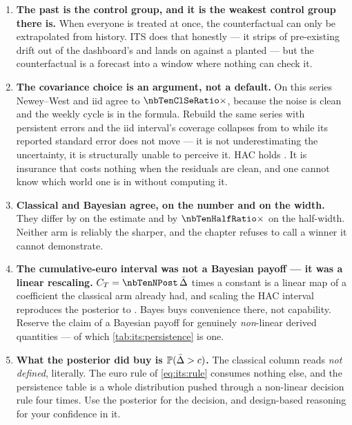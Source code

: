 \begin{enumerate}[leftmargin=*, itemsep=.45em]
  \item \textbf{The past is the control group, and it is the weakest control group there is.} When
        everyone is treated at once, the counterfactual can only be extrapolated from history. ITS
        does that honestly --- it strips \pp{\nbTenClDriftRemoved} of pre-existing drift out of the
        dashboard's \pp{\nbTenNaive} and lands on \pp{\nbTenClAvg} against a planted
        \pp{+\nbTenTrueLift} --- but the counterfactual is a forecast into a window where nothing
        can check it.

  \item \textbf{The covariance choice is an argument, not a default.} On this series Newey--West
        and iid agree to $\nbTenClSeRatio\times$, because the noise is clean and the weekly cycle is
        in the formula. Rebuild the same series with persistent errors and the iid interval's
        coverage collapses from \pc{\nbTenArCovIidZero} to \pc{\nbTenArCovIidEight} while its
        reported standard error does not move --- it is not underestimating the uncertainty, it is
        structurally unable to perceive it. HAC holds \pc{\nbTenArCovHacEight}. It is insurance that
        costs nothing when the residuals are clean, and one cannot know which world one is in
        without computing it.

  \item \textbf{Classical and Bayesian agree, on the number and on the width.} They differ by
        \pp{\nbTenEstDiff} on the estimate and by $\nbTenHalfRatio\times$ on the half-width. Neither
        arm is reliably the sharper, and the chapter refuses to call a winner it cannot demonstrate.

  \item \textbf{The cumulative-euro interval was not a Bayesian payoff --- it was a linear
        rescaling.} $C_T = \nbTenNPost\,\bar\Delta$ times a constant is a linear map of a
        coefficient the classical arm already had, and scaling the HAC interval reproduces the
        posterior to \eur{\nbTenEurGap}. Bayes buys convenience there, not capability. Reserve the
        claim of a Bayesian payoff for genuinely \emph{non}-linear derived quantities --- of which
        \cref{tab:its:persistence} is one.

  \item \textbf{What the posterior did buy is $\operatorname{\mathbb{P}}(\bar\Delta > c)$.} The classical column reads
        \emph{not defined}, literally. The euro rule of \cref{eq:its:rule} consumes nothing else,
        and the persistence table is a whole distribution pushed through a non-linear decision rule
        four times. Use the posterior for the decision, and design-based reasoning for your
        confidence in it.


\end{enumerate}
